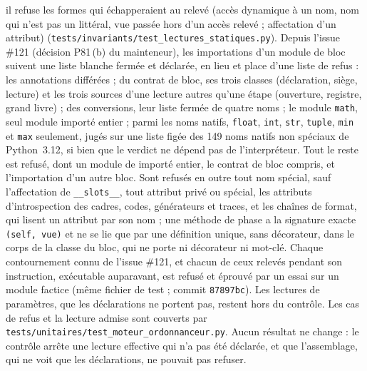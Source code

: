 \documentclass[11pt,a4paper]{article}
\newcommand{\code}[1]{\texttt{\detokenize{#1}}}
\begin{document}
il refuse les formes qui échapperaient au relevé (accès dynamique à un nom, nom qui n'est pas un littéral, vue passée hors d'un accès relevé ; affectation d'un attribut) (\nolinkurl{tests/invariants/test_lectures_statiques.py}). Depuis l'issue \#121 (décision P81\,(b) du mainteneur), les importations d'un module de bloc suivent une liste blanche fermée et déclarée, en lieu et place d'une liste de refus : les annotations différées ; du contrat de bloc, ses trois classes (déclaration, siège, lecture) et les trois sources d'une lecture autres qu'une étape (ouverture, registre, grand livre) ; des conversions, leur liste fermée de quatre noms ; le module \texttt{math}, seul module importé entier ; parmi les noms natifs, \texttt{float}, \texttt{int}, \texttt{str}, \texttt{tuple}, \texttt{min} et \texttt{max} seulement, jugés sur une liste figée des 149 noms natifs non spéciaux de Python~3.12, si bien que le verdict ne dépend pas de l'interpréteur. Tout le reste est refusé, dont un module de \code{nations} importé entier, le contrat de bloc compris, et l'importation d'un autre bloc. Sont refusés en outre tout nom spécial, sauf l'affectation de \texttt{\_\_slots\_\_}, tout attribut privé ou spécial, les attributs d'introspection des cadres, codes, générateurs et traces, et les chaînes de format, qui lisent un attribut par son nom ; une méthode de phase a la signature exacte \texttt{(self, vue)} et ne se lie que par une définition unique, sans décorateur, dans le corps de la classe du bloc, qui ne porte ni décorateur ni mot-clé. Chaque contournement connu de l'issue \#121, et chacun de ceux relevés pendant son instruction, exécutable auparavant, est refusé et éprouvé par un essai sur un module factice (même fichier de test ; commit \texttt{87897bc}). Les lectures de paramètres, que les déclarations ne portent pas, restent hors du contrôle. Les cas de refus et la lecture admise sont couverts par \nolinkurl{tests/unitaires/test_moteur_ordonnanceur.py}. Aucun résultat ne change : le contrôle arrête une lecture effective qui n'a pas été déclarée, et que l'assemblage, qui ne voit que les déclarations, ne pouvait pas refuser.
\end{document}
